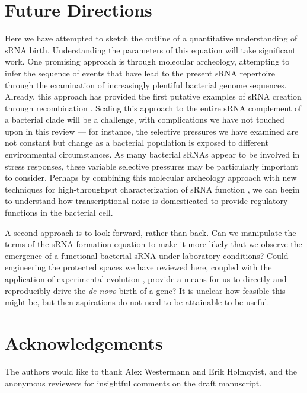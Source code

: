 \section{Future Directions} 

Here we have attempted to sketch the outline of a quantitative understanding of sRNA birth. Understanding the parameters of this equation will take significant work. One promising approach is through molecular archeology, attempting to infer the sequence of events that have lead to the present sRNA repertoire through the examination of increasingly plentiful bacterial genome sequences. Already, this approach has provided the first putative examples of sRNA creation through recombination \citep{Raghavan2015-wp}. Scaling this approach to the entire sRNA complement of a bacterial clade will be a challenge, with complications we have not touched upon in this review — for instance, the selective pressures we have examined are not constant but change as a bacterial population is exposed to different environmental circumstances. As many bacterial sRNAs appear to be involved in stress responses, these variable selective pressures may be particularly important to consider. Perhaps by combining this molecular archeology approach with new techniques for high-throughput characterization of sRNA function \citep{Barquist2015-ta}, we can begin to understand how transcriptional noise is domesticated to provide regulatory functions in the bacterial cell.\par

A second approach is to look forward, rather than back. Can we manipulate the terms of the sRNA formation equation to make it more likely that we observe the emergence of a functional bacterial sRNA under laboratory conditions? Could engineering the protected spaces we have reviewed here, coupled with the application of experimental evolution \citep{Cooper2018-oz,Cvijovic2018-lv}, provide a means for us to directly and reproducibly drive the \textit{de novo} birth of a gene? It is unclear how feasible this might be, but then aspirations do not need to be attainable to be useful.\par


\section{Acknowledgements}

The authors would like to thank Alex Westermann and Erik Holmqvist, and the anonymous reviewers for insightful comments on the draft manuscript.




